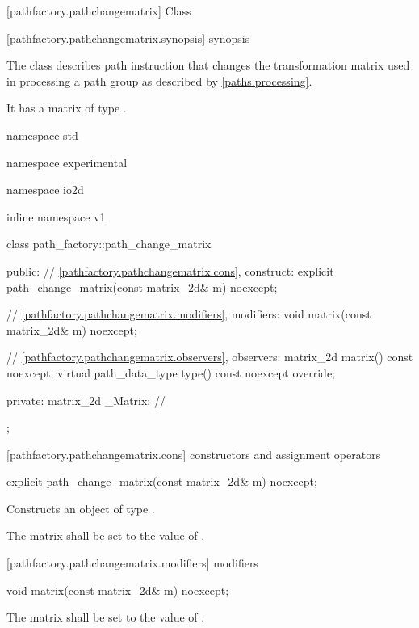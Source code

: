  [pathfactory.pathchangematrix] {Class }

 [pathfactory.pathchangematrix.synopsis] { synopsis}

\pnum
{}
The class  describes path instruction that changes the transformation matrix used in processing a path group as described by \ref{paths.processing}.

\pnum
It has a matrix of type .

\begin{codeblock}
namespace std { namespace experimental { namespace io2d { inline namespace v1 {
  class path_factory::path_change_matrix {
  public:
    // \ref{pathfactory.pathchangematrix.cons}, construct:
    explicit path_change_matrix(const matrix_2d& m) noexcept;

    // \ref{pathfactory.pathchangematrix.modifiers}, modifiers:
    void matrix(const matrix_2d& m) noexcept;

    // \ref{pathfactory.pathchangematrix.observers}, observers:
    matrix_2d matrix() const noexcept;
    virtual path_data_type type() const noexcept override;
    
  private:
    matrix_2d _Matrix; // \expos
  };
} } } }
\end{codeblock}

 [pathfactory.pathchangematrix.cons] { constructors and assignment operators}

\begin{itemdecl}
    explicit path_change_matrix(const matrix_2d& m) noexcept;
\end{itemdecl}
\begin{itemdescr}
	\pnum
	\effects
	Constructs an object of type .
	
	\pnum
	The matrix shall be set to the value of .
\end{itemdescr}

 [pathfactory.pathchangematrix.modifiers]{ modifiers}

\begin{itemdecl}
    void matrix(const matrix_2d& m) noexcept;
\end{itemdecl}
\begin{itemdescr}
	\pnum
	\effects
	The matrix shall be set to the value of .
\end{itemdescr}

